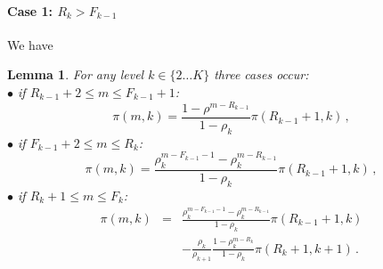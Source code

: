 \documentclass[conference]{IEEEtran}
\newtheorem{lem}{Lemma}
\begin{document}
\paragraph{Case 1: $R_{k} > F_{k-1}$} 
We have
\begin{lem}
For any level $k \in \{2 \ldots K\}$ three cases occur: \\
$\bullet$ if $R_{k-1}+2 \leq m \leq F_{k-1}+1$:
\begin{equation}
\pi(m,k)=\frac{1-\rho^{m-R_{k-1}} }{1-\rho_k}\pi(R_{k-1}+1,k) \, ,
\label{eq40b}
\end{equation}
$\bullet$ if $F_{k-1}+2 \leq m \leq R_{k}$:
\begin{equation}
\pi(m,k)= \frac{\rho_k^{m-F_{k-1}-1}-\rho_k^{m-R_{k-1}} } {1-\rho_k} \pi(R_{k-1}+1,k) \, ,
\label{eq31}
\end{equation}
$\bullet$ if  $R_k+1 \leq m \leq F_k$:
\begin{eqnarray}
\pi(m,k)&=& \frac{ \rho_k ^{m-F_{k-1}-1 } -\rho_k^{m-R_{k-1}} } {1-\rho_k} \pi(R_{k-1}+1,k) \nonumber \\
 &&- \frac{\rho_k}{\rho_{k+1}} \frac{1- \rho_k ^{m-R_k}} {1-\rho_k} \pi(R_{k}+1, k+1) \, .
 \label{eq38}
\end{eqnarray}
\end{lem}
\end{document}
